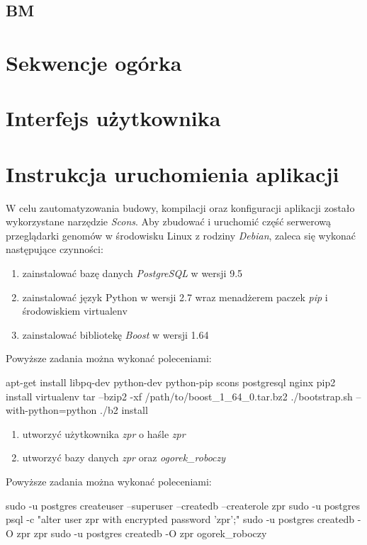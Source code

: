 \subsection*{BM}




\section{Sekwencje ogórka}

\section{Interfejs użytkownika}

\section{Instrukcja uruchomienia aplikacji}
W celu zautomatyzowania budowy, kompilacji oraz konfiguracji aplikacji zostało wykorzystane narzędzie \textit{Scons}.
Aby zbudować i uruchomić część serwerową przeglądarki genomów w środowisku Linux z rodziny \textit{Debian}, zaleca się wykonać następujące czynności:
\begin{enumerate}
	\item zainstalować bazę danych \textit{PostgreSQL} w wersji 9.5
	\item zainstalować język Python w wersji 2.7 wraz menadżerem paczek \textit{pip} i środowiskiem virtualenv
	\item zainstalować bibliotekę \textit{Boost} w wersji 1.64
\end{enumerate}
Powyższe zadania można wykonać poleceniami:

\begin{spverbatim}
	apt-get install libpq-dev python-dev python-pip scons postgresql nginx
	pip2 install virtualenv
	tar --bzip2 -xf /path/to/boost_1_64_0.tar.bz2 ./bootstrap.sh --with-python=python ./b2 install
\end{spverbatim}

\begin{enumerate}[resume]
	\item utworzyć użytkownika \textit{zpr} o haśle \textit{zpr}
	\item utworzyć bazy danych \textit{zpr} oraz \textit{ogorek\_roboczy}
\end{enumerate}
Powyższe zadania można wykonać poleceniami:

\begin{spverbatim}
	sudo -u postgres createuser --superuser --createdb --createrole zpr 
	sudo -u postgres psql -c "alter user zpr with encrypted password 'zpr';"
	sudo -u postgres createdb -O zpr zpr 
	sudo -u postgres createdb -O zpr ogorek_roboczy
\end{spverbatim}

